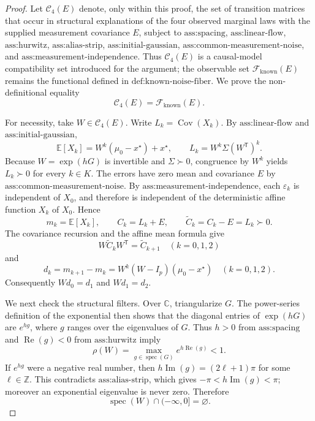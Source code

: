 \documentclass{article}
\begin{document}
\begin{proof}
Let \(\mathcal C_4(E)\) denote, only within this proof, the set of transition matrices that occur in structural explanations of the four observed marginal laws with the supplied measurement covariance \(E\), subject to \(\text{ass:spacing}\), \(\text{ass:linear-flow}\), \(\text{ass:hurwitz}\), \(\text{ass:alias-strip}\), \(\text{ass:initial-gaussian}\), \(\text{ass:common-measurement-noise}\), and \(\text{ass:measurement-independence}\).  Thus \(\mathcal C_4(E)\) is a causal-model compatibility set introduced for the argument; the observable set \(\mathcal F_{\mathrm{known}}(E)\) remains the functional defined in \(\text{def:known-noise-fiber}\).  We prove the non-definitional equality
\[
 \mathcal C_4(E)=\mathcal F_{\mathrm{known}}(E).
\]

For necessity, take \(W\in\mathcal C_4(E)\).  Write \(L_k=\operatorname{Cov}(X_k)\).  By \(\text{ass:linear-flow}\) and \(\text{ass:initial-gaussian}\),
\[
 \mathbb E[X_k]=W^k(\mu_0-x^\star)+x^\star,
 \qquad
 L_k=W^k\Sigma(W^{\mathsf T})^k .
\]
Because \(W=\exp(hG)\) is invertible and \(\Sigma\succ0\), congruence by \(W^k\) yields \(L_k\succ0\) for every \(k\in K\).  The errors have zero mean and covariance \(E\) by \(\text{ass:common-measurement-noise}\).  By \(\text{ass:measurement-independence}\), each \(\varepsilon_k\) is independent of \(X_0\), and therefore is independent of the deterministic affine function \(X_k\) of \(X_0\).  Hence
\[
 m_k=\mathbb E[X_k],
 \qquad
 C_k=L_k+E,
 \qquad
 \widetilde C_k=C_k-E=L_k\succ0.
\]
The covariance recursion and the affine mean formula give
\[
 W\widetilde C_kW^{\mathsf T}=\widetilde C_{k+1}\quad(k=0,1,2)
\]
and
\[
 d_k=m_{k+1}-m_k
     =W^k(W-I_p)(\mu_0-x^\star)\quad(k=0,1,2).
\]
Consequently \(Wd_0=d_1\) and \(Wd_1=d_2\).

We next check the structural filters.  Over \(\mathbb C\), triangularize \(G\).  The power-series definition of the exponential then shows that the diagonal entries of \(\exp(hG)\) are \(e^{hg}\), where \(g\) ranges over the eigenvalues of \(G\).  Thus \(h>0\) from \(\text{ass:spacing}\) and \(\operatorname{Re}(g)<0\) from \(\text{ass:hurwitz}\) imply
\[
 \rho(W)=\max_{g\in\operatorname{spec}(G)}e^{h\operatorname{Re}(g)}<1.
\]
If \(e^{hg}\) were a negative real number, then \(h\operatorname{Im}(g)=(2\ell+1)\pi\) for some \(\ell\in\mathbb Z\).  This contradicts \(\text{ass:alias-strip}\), which gives \(-\pi<h\operatorname{Im}(g)<\pi\); moreover an exponential eigenvalue is never zero.  Therefore
\[
 \operatorname{spec}(W)\cap(-\infty,0]=\varnothing.
\]


\end{proof}
\end{document}
